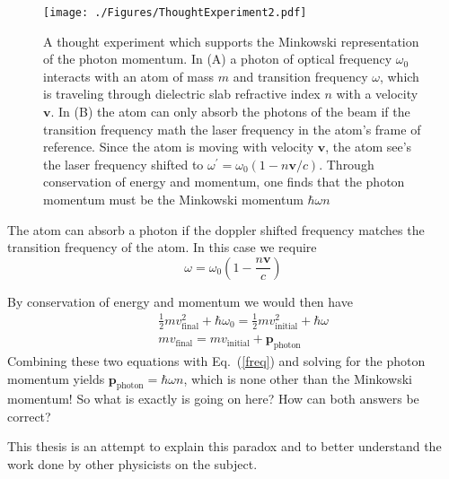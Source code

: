 \begin{figure}[htp]
\texttt{[image: ./Figures/ThoughtExperiment2.pdf]}
\caption{A thought experiment which supports the Minkowski representation of the photon momentum.  In (A) a photon of optical frequency $\omega_0$ interacts with an atom of mass $m$ and transition frequency $\omega$, which is traveling through dielectric slab refractive index $n$ with a velocity $\mathbf{v}$.  In (B) the atom can only absorb the photons of the beam if the transition frequency math the laser frequency in the atom's frame of reference. Since the atom is moving with velocity $\mathbf{v}$, the atom see's the laser frequency shifted to $\omega^{'}=\omega_0(1-n\mathbf{v}/c)$.  Through conservation of energy and momentum, one finds that the photon momentum must be the Minkowski momentum $\hbar\omega n$ } 
\label{fig:Thought1}
\end{figure}



The atom can absorb a photon if the doppler shifted frequency matches the transition frequency of the atom. In this case we require
\begin{equation}
\omega=\omega_0(1-\frac{n\mathbf{v}}{c})
\label{freq}
\end{equation}

By conservation of energy and momentum we would then have
\begin{eqnarray}
&&\frac{1}{2}mv^2_{\mathrm{final}}+\hbar\omega_0=\frac{1}{2}mv^2_{\mathrm{initial}}+\hbar\omega \\
&&mv_{\mathrm{final}}=mv_{\mathrm{initial}}+\mathbf{p}_{\mathrm{photon}}
\end{eqnarray}
Combining these two equations with Eq.\ (\ref{freq}) and solving for the photon momentum yields $\mathbf{p}_{\mathrm{photon}}=\hbar\omega n$, which is none other than the Minkowski momentum!  So what is exactly is going on here?  How can both answers be correct?

\vspace{5mm}

	This thesis is an attempt to explain this paradox and to better understand the work done by other physicists on the subject.

\vspace{5mm}


